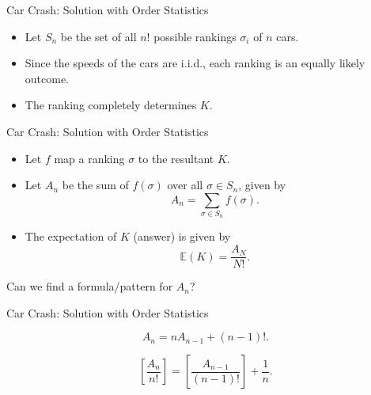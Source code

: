 \begin{frame}{Car Crash: Solution with Order Statistics}
  \begin{itemize}
    \item Let $S_n$ be the set of all $n!$ possible rankings $\sigma_i$ of $n$ cars.
    \item Since the speeds of the cars are i.i.d., each ranking is an equally likely outcome.
    \item The ranking completely determines $K$.
  \end{itemize}
  
  \begin{center}
    
  \end{center}
\end{frame}

\begin{frame}{Car Crash: Solution with Order Statistics}
  \begin{itemize}
    \item Let $f$ map a ranking $\sigma$ to the resultant $K$.
    \item Let $A_n$ be the sum of $f(\sigma)$ over all $\sigma \in S_n$, given by
    $$A_n = \sum_{\sigma \in S_n} f(\sigma).$$
    \item The expectation of $K$ (answer) is given by 
    $$\mathbb E(K)=\frac{A_N}{N!}.$$
  \end{itemize}

  \vspace{0.3cm}

  Can we find a formula/pattern for $A_n$?
\end{frame}

\begin{frame}{Car Crash: Solution with Order Statistics}
  \begin{center}
    
  \end{center}

  \begin{sqt:result}
    $$A_n = nA_{n-1} + (n-1)!.$$
  \end{sqt:result}
  $$\left[\frac{A_n}{n!}\right] = \left[\frac{A_{n-1}}{(n-1)!}\right] + \frac{1}{n}.$$
\end{frame}

